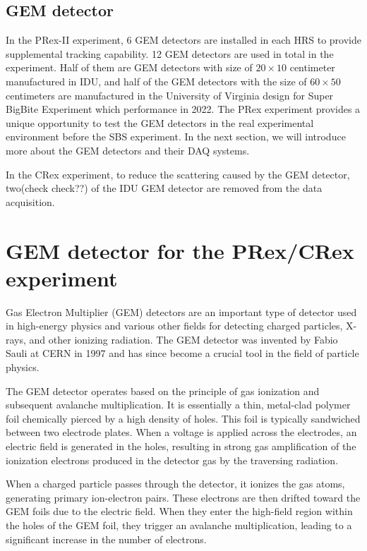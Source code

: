 \subsection{GEM detector}

In the PRex-II experiment, 6 GEM detectors are installed in each HRS to provide supplemental tracking capability. 12 GEM detectors are used in total in the experiment. Half of them are GEM detectors with size of $20\times 10$ centimeter manufactured in IDU, and half of the GEM detectors with the size of $60\times 50$ centimeters are manufactured in the University of Virginia design for Super BigBite Experiment which performance in 2022. The PRex experiment provides a unique opportunity to test the GEM detectors in the real experimental environment before the SBS experiment. In the next section, we will introduce more about the GEM detectors and their DAQ systems. 

In the CRex experiment, to reduce the scattering caused by the GEM detector, two(check check??) of the IDU GEM detector are removed from the data acquisition. 


\section{GEM detector for the PRex/CRex experiment}

Gas Electron Multiplier (GEM) detectors are an important type of detector used in high-energy physics and various other fields for detecting charged particles, X-rays, and other ionizing radiation. The GEM detector was invented by Fabio Sauli at CERN in 1997 and has since become a crucial tool in the field of particle physics.

The GEM detector operates based on the principle of gas ionization and subsequent avalanche multiplication. It is essentially a thin, metal-clad polymer foil chemically pierced by a high density of holes. This foil is typically sandwiched between two electrode plates. When a voltage is applied across the electrodes, an electric field is generated in the holes, resulting in strong gas amplification of the ionization electrons produced in the detector gas by the traversing radiation.

When a charged particle passes through the detector, it ionizes the gas atoms, generating primary ion-electron pairs. These electrons are then drifted toward the GEM foils due to the electric field. When they enter the high-field region within the holes of the GEM foil, they trigger an avalanche multiplication, leading to a significant increase in the number of electrons.

